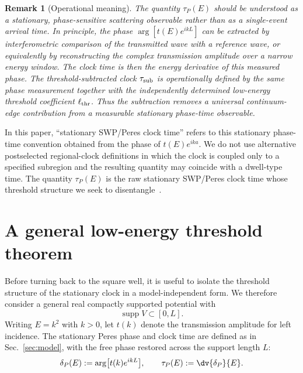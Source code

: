 \documentclass[aps,pra,preprint,notitlepage,nofootinbib]{revtex4-2}
\newtheorem{remark}{Remark}
\begin{document}
\begin{remark}[Operational meaning]
The quantity \(\tau_P(E)\) should be understood as a stationary,
phase-sensitive scattering observable rather than as a single-event arrival
time. In principle, the phase \(\arg[t(E)e^{ikL}]\) can be extracted by
interferometric comparison of the transmitted wave with a reference wave, or
equivalently by reconstructing the complex transmission amplitude over a narrow
energy window. The clock time is then the energy derivative of this measured
phase. The threshold-subtracted clock \(\tau_{\rm sub}\) is operationally
defined by the same phase measurement together with the independently determined
low-energy threshold coefficient \(\ell_{\rm thr}\). Thus the subtraction removes a universal continuum-edge
contribution from a measurable stationary phase-time observable.
\end{remark}

In this paper, ``stationary SWP/Peres clock time'' refers to this stationary phase-time convention obtained from the phase of $t(E)e^{ika}$. We do not use alternative postselected regional-clock definitions in which the clock is coupled only to a specified subregion and the resulting quantity may coincide with a dwell-type time. The quantity $\tau_P(E)$ is the raw stationary SWP/Peres clock time whose threshold structure we seek to disentangle~\cite{Peres1980,Davies2005}.

\section{A general low-energy threshold theorem}
\label{sec:general-threshold}

Before turning back to the square well, it is useful to isolate the threshold structure of the stationary clock in a model-independent form. We therefore consider a general real compactly supported potential with
\begin{equation}
\operatorname{supp}V\subset[0,L].
\end{equation}
Writing $E=k^2$ with $k>0$, let $t(k)$ denote the transmission amplitude for left incidence. The stationary Peres phase and clock time are defined as in Sec.~\ref{sec:model}, with the free phase restored across the support length $L$:
\begin{equation}
\delta_P(E):=\arg\!\big[t(k)e^{ikL}\big],
\qquad
\tau_P(E):=\dv{\delta_P}{E}.
\label{eq:deltaP-body}
\end{equation}
\end{document}

